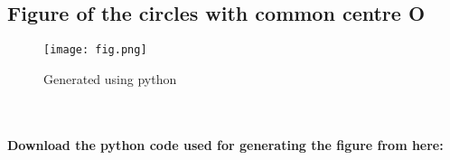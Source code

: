 \documentclass[a4paper,12pt]{article}
\begin{document}
\subsection{Figure of the circles with common centre O}
\begin{figure}
    \centering
    \texttt{[image: fig.png]}
    \caption{Generated using python}
    \label{fig:2}
\end{figure}

\\$$$$\\

  \textbf{Download the python code used for generating the figure from here:}
 
\end{document}
